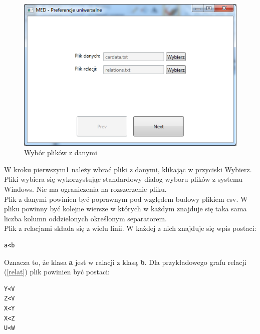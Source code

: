 \documentclass[a4paper,12pt]{article}
\begin{document}
\begin{figure}[h!]
\begin{center}
\includegraphics[width=\textwidth]{img/1.png}
\caption{Wybór plików z danymi}
\label{krok1}
\end{center}
\end{figure}

W kroku pierwszym\ref{krok1} należy wbrać pliki z danymi, klikając w przyciski Wybierz. Pliki wybiera się wykorzystując standardowy dialog wyboru plików z systemu Windows. Nie ma ograniczenia na rozszerzenie pliku.\\

Plik z danymi powinien być poprawnym pod względem budowy plikiem csv. W pliku powinny być kolejne wiersze w których w każdym znajduje się taka sama liczba kolumn oddzielonych określonym separatorem.\\

Plik z relacjami składa się z wielu linii. W każdej z nich znajduje się wpis postaci:
\lstset{frame=single, xleftmargin=6pt, xrightmargin=6pt, framesep=6pt}
\begin{lstlisting}
a<b
\end{lstlisting}
Oznacza to, że klasa {\bf a} jest w ralacji z klasą {\bf b}.
Dla przykładowego grafu relacji (\ref{relat}) plik powinien być postaci:
\lstset{frame=single, xleftmargin=6pt, xrightmargin=6pt, framesep=6pt}
\begin{lstlisting}
Y<V
Z<V
X<Y
X<Z
U<W
\end{lstlisting}
\end{document}
